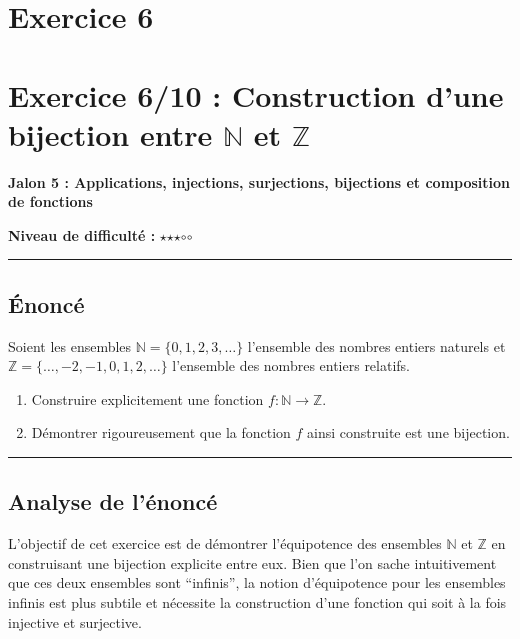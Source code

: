 \documentclass[12pt,a4paper]{report}
\providecommand{\tightlist}{%
  \setlength{\itemsep}{0pt}\setlength{\parskip}{0pt}}
\begin{document}
\section{Exercice 6}
\section{\texorpdfstring{Exercice 6/10 : Construction d'une bijection
entre \(\mathbb{N}\) et
\(\mathbb{Z}\)}{Exercice 6/10 : Construction d'une bijection entre \textbackslash mathbb\{N\} et \textbackslash mathbb\{Z\}}}\label{exercice-610-construction-dune-bijection-entre-mathbbn-et-mathbbz}

\textbf{Jalon 5 : Applications, injections, surjections, bijections et
composition de fonctions}

\textbf{Niveau de difficulté :} \(\star\)\(\star\)\(\star\)$\circ$$\circ$

\begin{center}\rule{0.5\linewidth}{0.5pt}\end{center}

\subsection{Énoncé}\label{uxe9noncuxe9}

Soient les ensembles \(\mathbb{N} = \{0, 1, 2, 3, \dots\}\) l'ensemble
des nombres entiers naturels et
\(\mathbb{Z} = \{\dots, -2, -1, 0, 1, 2, \dots\}\) l'ensemble des
nombres entiers relatifs.

\begin{enumerate}
\def\labelenumi{\arabic{enumi}.}
\tightlist
\item
  Construire explicitement une fonction
  \(f: \mathbb{N} \to \mathbb{Z}\).
\item
  Démontrer rigoureusement que la fonction \(f\) ainsi construite est
  une bijection.
\end{enumerate}

\begin{center}\rule{0.5\linewidth}{0.5pt}\end{center}

\subsection{Analyse de l'énoncé}\label{analyse-de-luxe9noncuxe9}

L'objectif de cet exercice est de démontrer l'équipotence des ensembles
\(\mathbb{N}\) et \(\mathbb{Z}\) en construisant une bijection explicite
entre eux. Bien que l'on sache intuitivement que ces deux ensembles sont
``infinis'', la notion d'équipotence pour les ensembles infinis est plus
subtile et nécessite la construction d'une fonction qui soit à la fois
injective et surjective.
\end{document}
